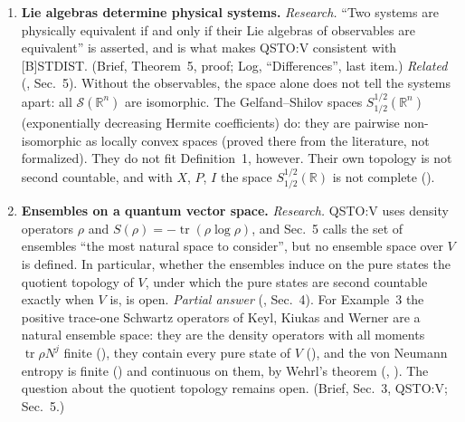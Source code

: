 \documentclass[11pt]{article}
\begin{document}
\begin{enumerate}
  observables (,
  ).
  Whether irreducibility of the representation implies the irreducibility condition above, whose
  operators need not be bounded, is open beyond the Heisenberg group $H_1$.
  (Brief, Sec.~5, ``Completeness of the Lie algebra''; Sec.~6.)
\item \textbf{Lie algebras determine physical systems.} \emph{Research.} ``Two systems
  are physically equivalent if and only if their Lie algebras of observables are equivalent'' is
  asserted, and is what makes QSTO:V consistent with [B]STDIST. (Brief, Theorem~5, proof; Log,
  ``Differences'', last item.)
  \emph{Related} (, Sec.~5). Without the observables, the space alone
  does not tell the systems apart: all $\mathcal S(\mathbb R^n)$ are isomorphic. The
  Gelfand--Shilov spaces $S^{1/2}_{1/2}(\mathbb R^n)$ (exponentially decreasing Hermite
  coefficients) do: they are pairwise non-isomorphic as locally convex spaces (proved there from
  the literature, not formalized). They do not fit Definition~1, however. Their own topology is not
  second countable, and with $X$, $P$, $I$ the space $S^{1/2}_{1/2}(\mathbb R)$ is not complete
  ().
\item \textbf{Ensembles on a quantum vector space.} \emph{Research.} QSTO:V uses
  density operators $\rho$ and $S(\rho) = -\operatorname{tr}(\rho\log\rho)$, and Sec.~5 calls the
  set of ensembles ``the most natural space to consider'', but no ensemble space over $V$ is
  defined. In particular, whether the ensembles induce on the pure states the quotient topology
  of $V$, under which the pure states are second countable exactly when $V$ is, is open.
  \emph{Partial answer} (, Sec.~4). For Example~3 the positive
  trace-one Schwartz operators of Keyl, Kiukas and Werner are a natural ensemble space: they are
  the density operators with all moments $\operatorname{tr}\rho N^j$ finite
  (), they contain every pure state of $V$
  (), and the von Neumann entropy is finite
  () and continuous on them, by
  Wehrl's theorem (,
  ). The question about
  the quotient topology remains open.
  (Brief, Sec.~3, QSTO:V; Sec.~5.)

\end{enumerate}
\end{document}
